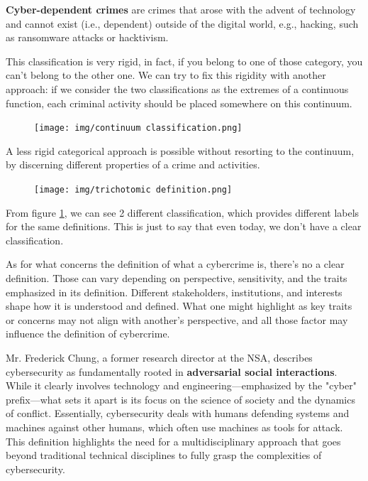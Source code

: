 \textbf{Cyber-dependent crimes} are crimes that arose with the advent
of technology and cannot exist (i.e., dependent) outside of the
digital world, e.g., hacking, such as ransomware attacks or
hacktivism.

This classification is very rigid, in fact, if you belong to one of
those category, you can't belong to the other one. We can try to fix
this rigidity with another approach: if we consider the two
classifications as the extremes of a continuous function, each criminal
activity should be placed somewhere on this continuum.

\begin{figure}[H]
  \centering
  \texttt{[image: img/continuum
  classification.png]}
\end{figure}

A less rigid categorical approach is possible without resorting to
the continuum, by discerning different properties of a crime and
activities. 

\begin{figure}[H]
  \centering
  \texttt{[image: img/trichotomic
  definition.png]}
  \label{fig:trichotomic-def}
\end{figure}

From figure \ref{fig:trichotomic-def}, we can see 2 different
classification, which provides different labels for the same
definitions. This is just to say that even today, we don't have a
clear classification.

As for what concerns the definition of what a cybercrime is, there's
no a clear definition. Those can vary depending on perspective,
sensitivity, and the traits emphasized in its definition. Different
stakeholders, institutions, and interests shape how it is understood
and defined. What one might highlight as key traits or concerns may
not align with another's perspective, and all those factor may
influence the definition of cybercrime.

Mr. Frederick Chung, a former research director at the NSA, describes
cybersecurity as fundamentally rooted in \textbf{adversarial social
interactions}. While it clearly involves technology and
engineering—emphasized by the "cyber" prefix—what sets it apart is its
focus on the science of society and the dynamics of conflict.
Essentially, cybersecurity deals with humans defending systems and
machines against other humans, which often use machines as tools for
attack. This definition highlights the need for a multidisciplinary
approach that goes beyond traditional technical disciplines to fully
grasp the complexities of cybersecurity.

